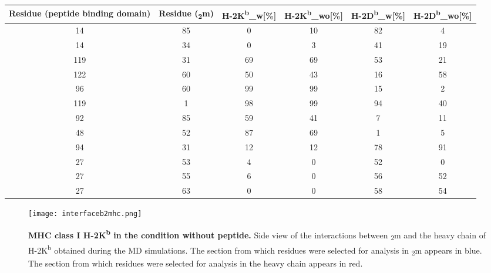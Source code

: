 \documentclass[11pt,twocolumn]{article}
\newcommand{\db}{H-2D\textsuperscript{b}\xspace}
\newcommand{\kb}{H-2K\textsuperscript{b}\xspace}
\newcommand{\angstr}{{\AA}ngstroms\xspace}
\newcommand{\btm}{\textbeta\textsubscript{2}m\xspace}
\begin{document}
   



\begin{table*}
\caption{\textbf{ Compilation of the the interacting residues used for the analysis of \kb and \db, and the percentage of interactions bellow below four \angstr, of each analysed condition.} The residues interacting coming from the peptide binding domain, the residues interacting coming from \btm and the percentage of their interaction which is below four \angstr is analysed in \db and \kb for the condition of with peptide and without peptide}
\label{KBDBinteractions}
\centering 
\resizebox{0.8\textwidth}{!} {
\begin{tabular}{|c|c|c|c|c|c|}  \hline
Residue (peptide binding domain)&Residue (\btm)&\kb{\_}w[\%]&\kb{\_}wo[\%]&\db{\_}w[\%]&\db{\_}wo[\%]\\ \hline
14&85&0&10&82&4\\ \hline
14&34&0&3&41&19\\ \hline
119&31&69&69&53&21\\ \hline
122&60&50&43&16&58\\ \hline
96&60&99&99&15&2\\ \hline
119&1&98&99&94&40\\ \hline
92&85&59&41&7&11\\ \hline
48&52&87&69&1&5\\ \hline
94&31&12&12&78&91\\ \hline
27&53&4&0&52&0\\ \hline
27&55&6&0&56&52\\ \hline
27&63&0&0&58&54\\ \hline
\end{tabular}
}
\end{table*}



\begin{figure}
\texttt{[image: interfaceb2mhc.png]}
\caption{\textbf{MHC class I \kb in the condition without peptide.} Side view of the interactions between \btm and the heavy chain of \kb obtained during the MD simulations. The section from which residues were selected for analysis in \btm appears in blue. The section from which residues were selected for analysis in the heavy chain appears in red.}
\label{interface}
\end{figure}
\end{document}
